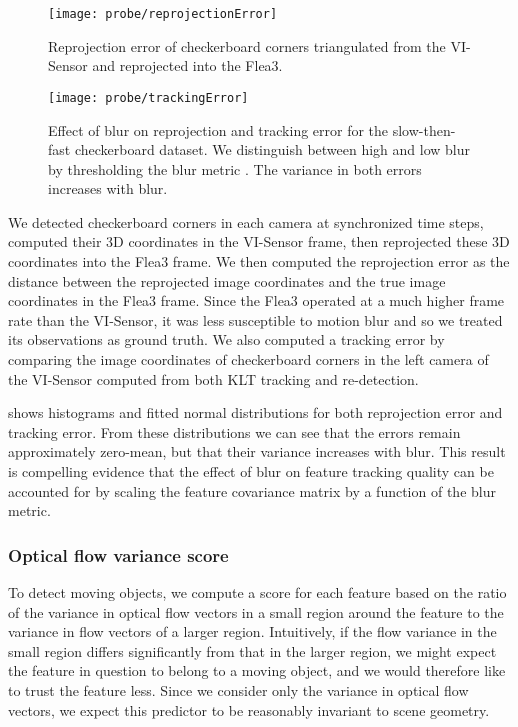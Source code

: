 \begin{figure}
    \centering
        \texttt{[image: probe/reprojectionError]}
        \label{fig:probe_visensor_reprojectionError}
      \caption{Reprojection error of checkerboard corners triangulated from the VI-Sensor and reprojected into the Flea3.}
\end{figure}

\begin{figure}
    \centering
    \texttt{[image: probe/trackingError]}
    \label{fig:probe_visensor_trackingError}
    \caption{Effect of blur on reprojection and tracking error for the slow-then-fast checkerboard dataset. We distinguish between high and low blur by thresholding the blur metric \cite{crete2007blur}. The variance in both errors increases with blur.}
    \label{fig:probe_visensor_histograms}
\end{figure}

We detected checkerboard corners in each camera at synchronized time steps, computed their 3D coordinates in the VI-Sensor frame, then reprojected these 3D coordinates into the Flea3 frame.
We then computed the reprojection error as the distance between the reprojected image coordinates and the true image coordinates in the Flea3 frame.
Since the Flea3 operated at a much higher frame rate than the VI-Sensor, it was less susceptible to motion blur and so we treated its observations as ground truth.
We also computed a tracking error by comparing the image coordinates of checkerboard corners in the left camera of the VI-Sensor computed from both KLT tracking \cite{Lucas:1981} and re-detection.

 shows histograms and fitted normal distributions for both reprojection error and tracking error.
From these distributions we can see that the errors remain approximately zero-mean, but that their variance increases with blur.
This result is compelling evidence that the effect of blur on feature tracking quality can be accounted for by scaling the feature covariance matrix by a function of the blur metric.


\subsubsection{Optical flow variance score}
To detect moving objects, we compute a score for each feature based on the ratio of the variance in optical flow vectors in a small region around the feature to the variance in flow vectors of a larger region.
Intuitively, if the flow variance in the small region differs significantly from that in the larger region, we might expect the feature in question to belong to a moving object, and we would therefore like to trust the feature less.
Since we consider only the variance in optical flow vectors, we expect this predictor to be reasonably invariant to scene geometry.

